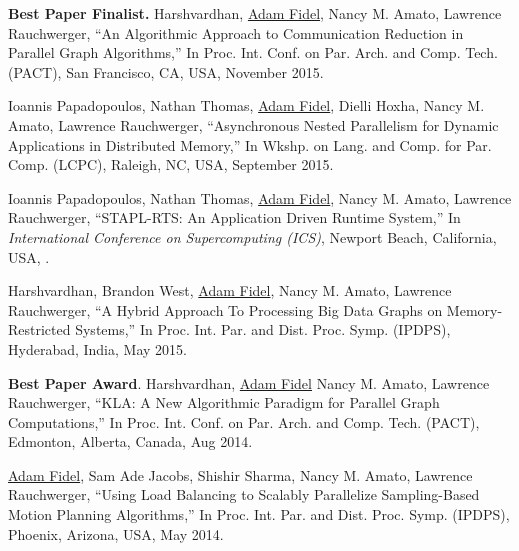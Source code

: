 \documentclass[a4paper,10pt,oneside]{article}
\begin{document}
\begin{body}
%

{{\bf Best Paper Finalist.} Harshvardhan, \underline{Adam Fidel}, Nancy M. Amato, Lawrence Rauchwerger, ``An Algorithmic Approach to Communication Reduction in Parallel Graph Algorithms,'' In Proc. Int. Conf. on Par. Arch. and Comp. Tech. (PACT), San Francisco, CA, USA, November 2015.}

\EntryGap

{Ioannis Papadopoulos, Nathan Thomas, \underline{Adam Fidel}, Dielli Hoxha, Nancy M. Amato, Lawrence Rauchwerger, ``Asynchronous Nested Parallelism for Dynamic Applications in Distributed Memory,'' In Wkshp. on Lang. and Comp. for Par. Comp. (LCPC), Raleigh, NC, USA, September 2015.}

\EntryGap

{Ioannis Papadopoulos, Nathan Thomas, \underline{Adam Fidel}, Nancy M. Amato, Lawrence Rauchwerger, ``STAPL-RTS: An Application Driven Runtime System,'' In \textit{International Conference on Supercomputing (ICS)}, Newport Beach, California, USA, .}

\EntryGap

{Harshvardhan, Brandon West, \underline{Adam Fidel}, Nancy M. Amato, Lawrence Rauchwerger, ``A Hybrid Approach To Processing Big Data Graphs on Memory-Restricted Systems,'' In Proc. Int. Par. and Dist. Proc. Symp. (IPDPS), Hyderabad, India, May 2015.}

\EntryGap

{{\bf Best Paper Award}. Harshvardhan, \underline{Adam Fidel} Nancy M. Amato, Lawrence Rauchwerger, ``KLA: A New Algorithmic Paradigm for Parallel Graph Computations,'' In Proc. Int. Conf. on Par. Arch. and Comp. Tech. (PACT), Edmonton, Alberta, Canada, Aug 2014.}

\EntryGap

{\underline{Adam Fidel}, Sam Ade Jacobs, Shishir Sharma, Nancy M. Amato, Lawrence Rauchwerger, ``Using Load Balancing to Scalably Parallelize Sampling-Based Motion Planning Algorithms,'' In Proc. Int. Par. and Dist. Proc. Symp. (IPDPS), Phoenix, Arizona, USA, May 2014.}


\end{body}
\end{document}
